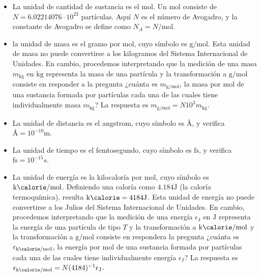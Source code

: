 \documentclass{article}
\begin{document}
  \begin{itemize}
    \item La unidad de cantidad de sustancia es el mol.
    Un mol consiste de \(N = 6.022 140 76 \cdot 10^{23}\) partículas.
    Aquí \(N\) es el número de Avogadro, y la constante de Avogadro se define como \(N_A = N \unit{\per\mole}\).

    \item la unidad de masa es el gramo por mol, cuyo símbolo es \(\unit{\gram\per\mole}\).
    Esta unidad de masa no puede convertirse a los kilogramos del Sistema Internacional de Unidades.
    En cambio, procedemos interpretando que la medición de una masa \(m_{\unit{\kilogram}}\) en \(\unit{\kilogram}\) representa la masa de una partícula y la transformación a \(\unit{\gram\per\mole}\) consiste en responder a la pregunta
    ¿cuánta es \(m_{\unit{\gram\per\mole}}\), la masa por mol de una sustancia formada por partículas cada una de las cuales tiene individualmente masa \(m_{\unit{\kilo\gram}}\)?
    La respuesta es \(m_{\unit{\gram\per\mole}} = N 10^3 m_{\unit{\kilogram}}\).

    \item La unidad de distancia es el angstrom, cuyo símbolo es \(\unit{\angstrom}\), y verifica \(\unit{\angstrom} = 10^{- 10} \unit{\metre
    }\).

    \item La unidad de tiempo es el femtosegundo, cuyo símbolo es \(\unit{\femto\second}\), y verifica \(\unit{\femto\second} = 10^{- 15} s\).

    \item La unidad de energía es la kilocaloría por mol, cuyo símbolo es \(\unit{\kilo\calorie\per\mole}\).
    Definiendo una caloría como \(4.184 \unit{\joule}\) (la caloría termoquímica), resulta \(\unit{\kilo\calorie} = 4184 \unit{\joule}\).
    Esta unidad de energía no puede convertirse a los Julios del Sistema Internacional de Unidades.
    En cambio, procedemos interpretando que la medición de una energía \(\epsilon_{\unit{\joule}}\) en \(\unit{\joule}\) representa la energía de una partícula de tipo \(T\) y la transformación a \(\unit{\kilo\calorie\per\mole}\) y la transformación a \(\unit{\gram\per\mole}\) consiste en respondera la pregunta
    ¿cuánta es \(\epsilon_{\unit{\kilo\calorie\per\mole}}\), la energía por mol de una sustancia formada por partículas cada una de las cuales tiene individualmente energía \(\epsilon_{\unit{\joule}}\)?
    La respuesta es \(\epsilon_{\unit{\kilo\calorie\per\mole}} = N (4184)^{-1} \epsilon_{\unit{\joule}}\).


\end{itemize}
\end{document}
